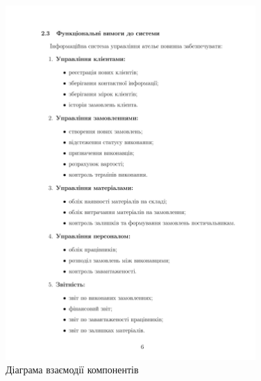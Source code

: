 \documentclass[14pt,a4paper]{extarticle}
\begin{document}
\begin{figure}[h!]
\centering
\includegraphics[width=0.85\textwidth]{diagrams/diagram-07.png}
\caption{Діаграма взаємодії компонентів}
\end{figure}

\newpage
\end{document}
